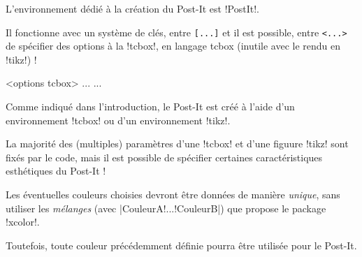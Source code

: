 \documentclass[french,a4paper,11pt]{article}
\begin{document}
\begin{cautionblock}
L'environnement dédié à la création du Post-It est \packagetex!PostIt!.

Il fonctionne avec un système de clés, entre \texttt{[...]} et il est possible, entre \texttt{<...>} de spécifier des options à la \motcletex!tcbox!, en langage \textsf{tcbox} (inutile avec le rendu en \motcletex!tikz!) !
\end{cautionblock}

\begin{DemoCode}
\begin{PostIt}[clés]<options tcbox>
...
...
\end{PostIt}
\end{DemoCode}

\begin{noteblock}
Comme indiqué dans l'introduction, le Post-It est créé à l'aide d'un environnement \motcletex!tcbox! ou d'un environnement \motcletex!tikz!.

La majorité des (multiples) paramètres d'une \motcletex!tcbox! et d'une figuure \motcletex!tikz! sont fixés par le code, mais il est possible de spécifier certaines caractéristiques esthétiques du Post-It !
\end{noteblock}

\begin{DemoCode}[]
\begin{PostIt}
\lipsum[1][1-2]
\end{PostIt}
\end{DemoCode}

\begin{DemoCode}[]
\begin{PostIt}[Rendu=tikz]
	\lipsum[1][1-2]
\end{PostIt}
\begin{PostIt}[Rendu=tikzv2]
	\lipsum[1][1-2]
\end{PostIt}
\end{DemoCode}

\begin{tipblock}
Les éventuelles couleurs choisies devront être données de manière \textit{unique}, sans utiliser les \textit{mélanges} (avec \motcletex|CouleurA!...!CouleurB|) que propose le package \packagetex!xcolor!. 

Toutefois, toute couleur précédemment définie pourra être utilisée pour le Post-It.
\end{tipblock}
\end{document}
